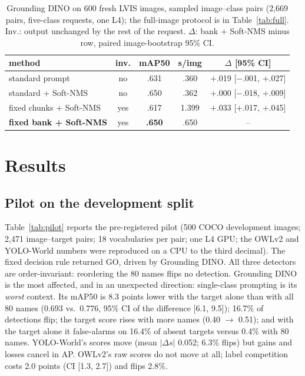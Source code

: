 \documentclass[10pt,twocolumn,letterpaper]{article}
\begin{document}
\begin{table}[t]\centering\footnotesize\setlength{\tabcolsep}{2pt}
\caption{Grounding DINO on 600 fresh LVIS images, sampled image--class pairs (2{,}669 pairs, five-class requests, one L4); the full-image protocol is in Table~\ref{tab:full}. Inv.: output unchanged
by the rest of the request. $\Delta$: bank + Soft-NMS minus row, paired image-bootstrap 95\% CI.}\label{tab:bank}
\begin{tabular}{lcccc}\toprule
method & inv. & mAP50 & s/img & $\Delta$ [95\% CI]\\\midrule
standard prompt & no & .631 & .360 & $+$.019 [$-$.001, $+$.027]\\
standard + Soft-NMS & no & .650 & .362 & $+$.000 [$-$.018, $+$.009]\\
fixed chunks + Soft-NMS & yes & .617 & 1.399 & $+$.033 [$+$.017, $+$.045]\\
\textbf{fixed bank + Soft-NMS} & yes & \textbf{.650} & .650 & --\\\bottomrule
\end{tabular}\end{table}

\section{Results}
\subsection{Pilot on the development split}
Table~\ref{tab:pilot} reports the pre-registered pilot (500 COCO development images; 2{,}471 image--target pairs;
18 vocabularies per pair; one L4 GPU; the OWLv2 and YOLO-World numbers were reproduced on a CPU to the third decimal).
The fixed decision rule returned GO, driven by Grounding DINO. All three detectors are order-invariant: reordering the
80 names flips no detection. Grounding DINO is the most affected, and in an unexpected direction: single-class
prompting is its \emph{worst} context. Its mAP50 is 8.3 points lower with the target alone than with all 80 names
(0.693 vs.\ 0.776, 95\% CI of the difference [6.1, 9.5]); 16.7\% of detections flip; the target score rises with
more names (0.40 $\rightarrow$ 0.51); and with the target alone it false-alarms on 16.4\% of absent targets versus
0.4\% with 80 names. YOLO-World's scores move (mean $|\Delta s|$ 0.052; 6.3\% flips) but gains and losses cancel in AP.
OWLv2's raw scores do not move at all; label competition costs 2.0 points (CI [1.3, 2.7]) and flips 2.8\%.
\end{document}
